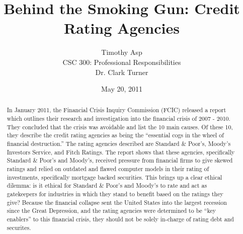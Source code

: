 \documentclass[11pt]{article}
\begin{document}
\title{\vfill Behind the Smoking Gun: Credit Rating Agencies} %
\author{
Timothy Asp\vspace{10pt} \\
CSC 300: Professional Responsibilities\vspace{10pt} \\
Dr. Clark Turner\vspace{10pt} \\
}
\date{May 20, 2011}

\maketitle

\vfill  %
\begin{abstract}
In January 2011, the Financial Crisis Inquiry Commission (FCIC) released a report which outlines their research and investigation into the financial crisis of 2007 - 2010.  They concluded that the crisis was avoidable and list the 10 main causes.\cite[p.~417-418]{govtReport}  Of these 10, they describe the credit rating agencies as being the ``essential cogs in the wheel of financial destruction.''\cite[p.~xxv]{govtReport} The rating agencies described are Standard \& Poor's, Moody's Investors Service, and Fitch Ratings.  The report shows that these agencies, specifically Standard \& Poor's and Moody's, received pressure from financial firms to give skewed ratings \cite{ratingEthics, hRatingEthics} and relied on outdated and flawed computer models in their rating of investments, specifically mortgage backed securities. \cite[p.~xxv]{govtReport}  This brings up a clear ethical dilemma: is it ethical for Standard \& Poor's and Moody's to rate and act as gatekeepers for industries in which they stand to benefit based on the ratings they give?  Because the financial collapse sent the United States into the largest recession since the Great Depression, and the rating agencies were determined to be ``key enablers'' to this financial crisis, they should not be solely in-charge of rating debt and securites. 
\end{abstract}

\thispagestyle{empty} %
\newpage


\thispagestyle{empty}  %
\tableofcontents
\end{document}
